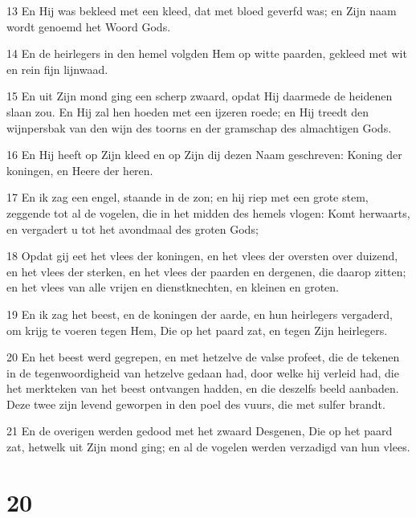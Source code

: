 \par 13 En Hij was bekleed met een kleed, dat met bloed geverfd was; en Zijn naam wordt genoemd het Woord Gods.
\par 14 En de heirlegers in den hemel volgden Hem op witte paarden, gekleed met wit en rein fijn lijnwaad.
\par 15 En uit Zijn mond ging een scherp zwaard, opdat Hij daarmede de heidenen slaan zou. En Hij zal hen hoeden met een ijzeren roede; en Hij treedt den wijnpersbak van den wijn des toorns en der gramschap des almachtigen Gods.
\par 16 En Hij heeft op Zijn kleed en op Zijn dij dezen Naam geschreven: Koning der koningen, en Heere der heren.
\par 17 En ik zag een engel, staande in de zon; en hij riep met een grote stem, zeggende tot al de vogelen, die in het midden des hemels vlogen: Komt herwaarts, en vergadert u tot het avondmaal des groten Gods;
\par 18 Opdat gij eet het vlees der koningen, en het vlees der oversten over duizend, en het vlees der sterken, en het vlees der paarden en dergenen, die daarop zitten; en het vlees van alle vrijen en dienstknechten, en kleinen en groten.
\par 19 En ik zag het beest, en de koningen der aarde, en hun heirlegers vergaderd, om krijg te voeren tegen Hem, Die op het paard zat, en tegen Zijn heirlegers.
\par 20 En het beest werd gegrepen, en met hetzelve de valse profeet, die de tekenen in de tegenwoordigheid van hetzelve gedaan had, door welke hij verleid had, die het merkteken van het beest ontvangen hadden, en die deszelfs beeld aanbaden. Deze twee zijn levend geworpen in den poel des vuurs, die met sulfer brandt.
\par 21 En de overigen werden gedood met het zwaard Desgenen, Die op het paard zat, hetwelk uit Zijn mond ging; en al de vogelen werden verzadigd van hun vlees.

\chapter{20}

